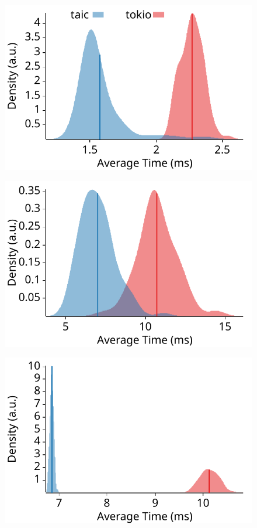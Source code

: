 \begin{figure}[htbp]
    \centering
    \begin{minipage}[c]{0.32\textwidth}
		\centering
		\includegraphics[width=\textwidth]{figures/tokio/chained_spawn.pdf}
		\label{tokio_chained_spawn}
	\end{minipage}
    \begin{minipage}[c]{0.32\textwidth}
		\centering
		\includegraphics[width=\textwidth]{figures/tokio/spawn_local.pdf}
		\label{tokio_spawn_local}
	\end{minipage}
    \begin{minipage}[c]{0.32\textwidth}
		\centering
		\includegraphics[width=\textwidth]{figures/tokio/spawn_remote_idle.pdf}

\end{minipage}
\end{figure}
